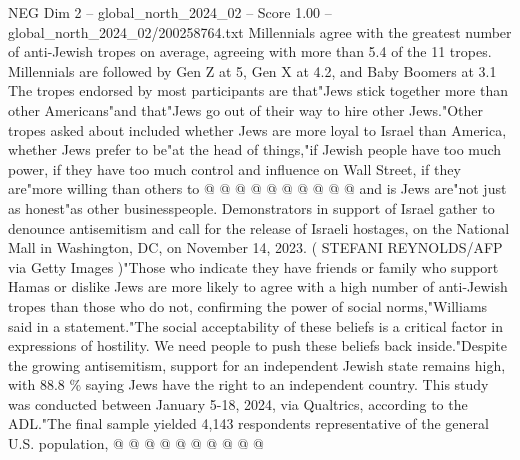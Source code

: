 \begin{textsample}{NEG Dim 2 – global\_north\_2024\_02 – Score 1.00 – global\_north\_2024\_02/200258764.txt}
Millennials agree with the greatest number of anti-Jewish tropes on average, agreeing with more than 5.4 of the 11 tropes.
Millennials are followed by Gen Z at 5, Gen X at 4.2, and Baby Boomers at 3.1 The tropes endorsed by most participants are that"Jews stick together more than other Americans"and that"Jews go out of their way to hire other Jews."Other tropes asked about included whether Jews are more loyal to Israel than America, whether Jews prefer to be"at the head of things,"if Jewish people have too much power, if they have too much control and influence on Wall Street, if they are"more willing than others to @ @ @ @ @ @ @ @ @ @ and is Jews are"not just as honest"as other businesspeople.
Demonstrators in support of Israel gather to denounce antisemitism and call for the release of Israeli hostages, on the National Mall in Washington, DC, on November 14, 2023. ( STEFANI REYNOLDS/AFP via Getty Images )"Those who indicate they have friends or family who support Hamas or dislike Jews are more likely to agree with a high number of anti-Jewish tropes than those who do not, confirming the power of social norms,"Williams said in a statement."The social acceptability of these beliefs is a critical factor in expressions of hostility.
We need people to push these beliefs back inside."Despite the growing antisemitism, support for an independent Jewish state remains high, with 88.8 \% saying Jews have the right to an independent country.
This study was conducted between January 5-18, 2024, via Qualtrics, according to the ADL."The final sample yielded 4,143 respondents representative of the general U.S. population, @ @ @ @ @ @ @ @ @ @

\end{textsample}
